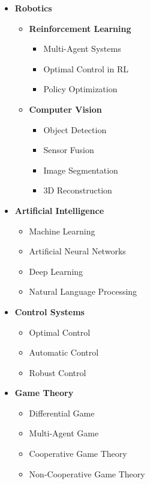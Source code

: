 \documentclass[12pt]{article}
\begin{document}
\vspace{6pt}
\begin{multicols}{2} %
	\centering
\begin{itemize} %
	\item \textbf{\noindent Robotics}
	\begin{itemize} \itemsep -1pt %
	    \item \textbf{Reinforcement Learning}
	    \begin{itemize} 
	        \item Multi-Agent Systems
	        \item Optimal Control in RL
	        \item Policy Optimization
	    \end{itemize}
	    \item \textbf{Computer Vision}
	    \begin{itemize} 
	        \item Object Detection
	        \item Sensor Fusion
	        \item Image Segmentation
	        \item 3D Reconstruction
	    \end{itemize}
	\end{itemize}
	\item \textbf{Artificial Intelligence}
	\begin{itemize} \itemsep -1pt
	    \item Machine Learning 
	    \item Artificial Neural Networks 
	    \item Deep Learning 
	    \item Natural Language Processing
	\end{itemize}
	\item \textbf{Control Systems}
	\begin{itemize} \itemsep -1pt
	    \item Optimal Control
	    \item Automatic Control
	    \item Robust Control
	\end{itemize}
	\item \textbf{Game Theory}
	\begin{itemize} \itemsep -1pt
	    \item Differential Game
	    \item Multi-Agent Game
	    \item Cooperative Game Theory
	    \item Non-Cooperative Game Theory
	\end{itemize}
\end{itemize}
\end{multicols}
\end{document}
